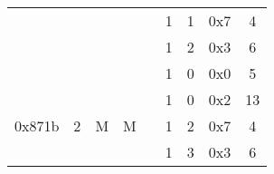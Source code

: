 \documentclass[11pt]{homework}
\newcommand{\cmark}{\ding{51}}%
\begin{document}
\begin{arabicparts}
\begin{center}
\begin{tabular}{|c|c|c|c|c|c|c|c|c|}
            \cline{6-9}
                                     &                                                                        &                                                                   &                                                                    &                                                                      & 1                        & 1         & 0x7 & 4             \\
            \cline{6-9}
                                     &                                                                        &                                                                   &                                                                    &                                                                      & 1                        & 2         & 0x3 & 6             \\
            \cline{6-9}
                                     &                                                                        &                                                                   &                                                                    &                                                                      & 1                        & 0         & 0x0 & 5             \\
            \hline
            \multirow{4}{*}{0x871b}  & \multirow{4}{*}{2}                                                     & \multirow{4}{*}{M}                                                & \multirow{4}{*}{M}                                                 & \multirow{4}{*}{\cmark}                                              & 1                        & 0         & 0x2 & 13            \\
            \cline{6-9}
                                     &                                                                        &                                                                   &                                                                    &                                                                      & 1                        & 2         & 0x7 & 4             \\
            \cline{6-9}
                                     &                                                                        &                                                                   &                                                                    &                                                                      & 1                        & 3         & 0x3 & 6             \\

\end{tabular}
\end{center}
\end{arabicparts}
\end{document}
